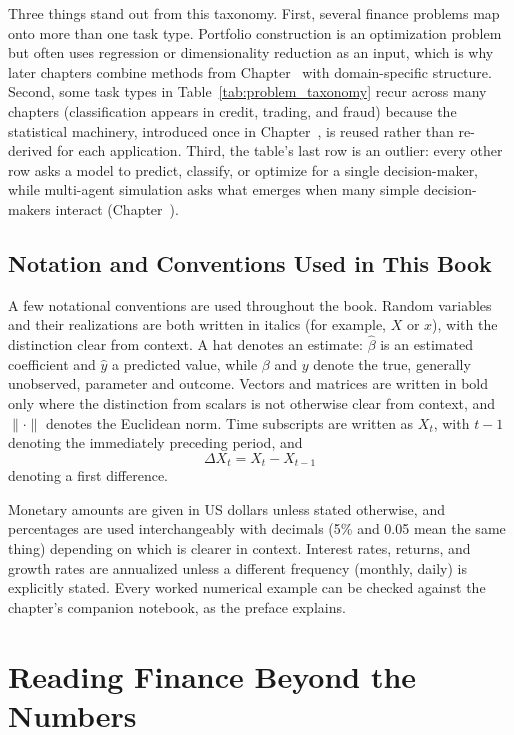 \documentclass[../ai_in_finance]{subfiles}
\begin{document}
Three things stand out from this taxonomy. First, several finance problems map onto more than one task type. Portfolio construction is an optimization problem but often uses regression or dimensionality reduction as an input, which is why later chapters combine methods from Chapter~ with domain-specific structure. Second, some task types in Table~\ref{tab:problem_taxonomy} recur across many chapters (classification appears in credit, trading, and fraud) because the statistical machinery, introduced once in Chapter~, is reused rather than re-derived for each application. Third, the table's last row is an outlier: every other row asks a model to predict, classify, or optimize for a single decision-maker, while multi-agent simulation asks what emerges when many simple decision-makers interact (Chapter~).

\subsection{Notation and Conventions Used in This Book}

A few notational conventions are used throughout the book. Random variables and their realizations are both written in italics (for example, $X$ or $x$), with the distinction clear from context. A hat denotes an estimate: $\hat\beta$ is an estimated coefficient and $\hat y$ a predicted value, while $\beta$ and $y$ denote the true, generally unobserved, parameter and outcome. Vectors and matrices are written in bold only where the distinction from scalars is not otherwise clear from context, and $\|\cdot\|$ denotes the Euclidean norm. Time subscripts are written as $X_t$, with $t-1$ denoting the immediately preceding period, and
$$\Delta X_t = X_t - X_{t-1}$$
denoting a first difference.

Monetary amounts are given in US dollars unless stated otherwise, and percentages are used interchangeably with decimals (5\% and 0.05 mean the same thing) depending on which is clearer in context. Interest rates, returns, and growth rates are annualized unless a different frequency (monthly, daily) is explicitly stated. Every worked numerical example can be checked against the chapter's companion notebook, as the preface explains.

\section{Reading Finance Beyond the Numbers}
\end{document}
